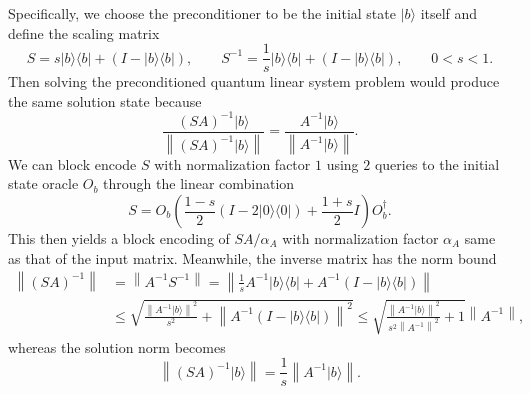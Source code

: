 \documentclass[letterpaper,onecolumn,11pt,accepted=2026-02-14]{quantumarticle}
\newcommand{\norm}[1]{\left\lVert#1\right\rVert}
\theoremstyle{remark}
\theoremstyle{plain}
\newcommand{\ket}[1]{|#1\rangle}
\newcommand{\bra}[1]{\langle#1|}
\newcommand{\ketbra}[2]{\ket{#1}\!\bra{#2}}
\begin{document}
Specifically, we choose the preconditioner to be the initial state $\ket{b}$ itself and define the scaling matrix
\begin{equation}
\label{eq:qls_precond_operator}
    S=s\ketbra{b}{b}+\left(I-\ketbra{b}{b}\right),\qquad
    S^{-1}=\frac{1}{s}\ketbra{b}{b}+\left(I-\ketbra{b}{b}\right),\qquad
    0<s<1.
\end{equation}
Then solving the preconditioned quantum linear system problem would produce the same solution state because
\begin{equation}
    \frac{(SA)^{-1}\ket{b}}{\norm{(SA)^{-1}\ket{b}}}
    =\frac{A^{-1}\ket{b}}{\norm{A^{-1}\ket{b}}}.
\end{equation}
We can block encode $S$ with normalization factor $1$ using $2$ queries to the initial state oracle $O_b$ through the linear combination
\begin{equation}
    S=O_b\left(\frac{1-s}{2}(I-2\ketbra{0}{0})+\frac{1+s}{2}I\right)O_b^\dagger.
\end{equation}
This then yields a block encoding of $SA/\alpha_A$ with normalization factor $\alpha_A$ same as that of the input matrix.
Meanwhile, the inverse matrix has the norm bound
\begin{equation}
\begin{aligned}
    \norm{(SA)^{-1}}&=\norm{A^{-1}S^{-1}}=\norm{\frac{1}{s}A^{-1}\ketbra{b}{b}+A^{-1}\left(I-\ketbra{b}{b}\right)}\\
    &\leq\sqrt{\frac{\norm{A^{-1}\ket{b}}^2}{s^2}+\norm{A^{-1}\left(I-\ketbra{b}{b}\right)}^2}
    \leq\sqrt{\frac{\norm{A^{-1}\ket{b}}^2}{s^2\norm{A^{-1}}^2}+1}\norm{A^{-1}},
\end{aligned}
\end{equation}
whereas the solution norm becomes
\begin{equation}
    \norm{(SA)^{-1}\ket{b}}
    =\frac{1}{s}\norm{A^{-1}\ket{b}}.
\end{equation}
\end{document}
